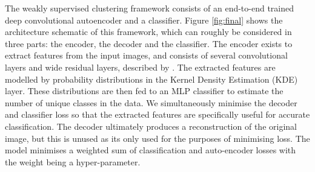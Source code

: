 \documentclass{article} %
\begin{document}

The weakly supervised clustering framework consists of an end-to-end trained deep convolutional autoencoder and a classifier. Figure \ref{fig:final} shows the architecture schematic of this framework, which can roughly be considered in three parts: the encoder, the decoder and the classifier. The encoder exists to extract features from the input images, and consists of several convolutional layers and wide residual layers, described by \cite{zagoruyko2016wide}. The extracted features are modelled by probability distributions in the Kernel Density Estimation (KDE) layer. These distributions are then fed to an MLP classifier to estimate the number of unique classes in the data. We simultaneously minimise the decoder and classifier loss so that the extracted features are specifically useful for accurate classification. The decoder ultimately produces a reconstruction of the original image, but this is unused as its only used for the purposes of minimising loss. The model minimises a weighted sum of classification and auto-encoder losses with the weight being a hyper-parameter.
\end{document}
